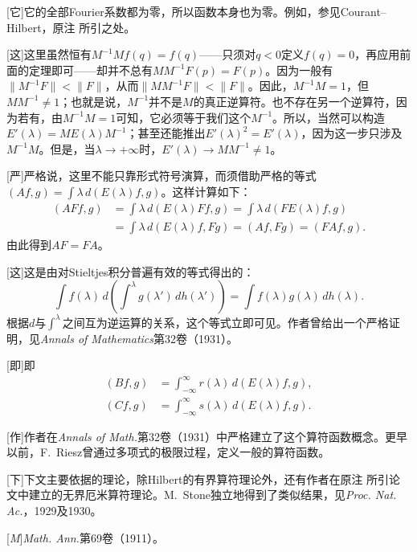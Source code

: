 \documentclass[fontsize=13pt,twoside,openany,headings=normal,parskip=false,bookmarkpackage=false,DIV=calc]{scrbook}
\begin{document}
[它]{它的全部Fourier系数都为零，所以函数本身也为零。例如，参见Courant–Hilbert，原注 \hyperlink{note-30}{} 所引之处。\hypertarget{origpage-246}{}\label{origpage-246}}

[这]{这里虽然恒有$M^{-1}Mf(q)=f(q)$——只须对$q<0$定义$f(q)=0$，再应用前面的定理即可——却并不总有$MM^{-1}F(p)=F(p)$。因为一般有$\lVert M^{-1}F\rVert<\lVert F\rVert$，从而$\lVert MM^{-1}F\rVert<\lVert F\rVert$。因此，$M^{-1}M=1$，但$MM^{-1}\ne1$；也就是说，$M^{-1}$并不是$M$的真正逆算符。也不存在另一个逆算符，因为若有，由$M^{-1}M=1$可知，它必须等于我们这个$M^{-1}$。所以，当然可以构造$E'(\lambda)=ME(\lambda)M^{-1}$；甚至还能推出$E'(\lambda)^2=E'(\lambda)$，因为这一步只涉及$M^{-1}M$。但是，当$\lambda\to+\infty$时，$E'(\lambda)\to MM^{-1}\ne1$。}

[严]{严格说，这里不能只靠形式符号演算，而须借助严格的等式$(Af,\allowbreak g)=\int\lambda\,d(E(\lambda)f,\allowbreak g)$。这样计算如下：
\begin{align*}
(AFf,g)&=\int\lambda\,d(E(\lambda)Ff,g)
=\int\lambda\,d(FE(\lambda)f,g)\\
&=\int\lambda\,d(E(\lambda)f,Fg)
=(Af,Fg)=(FAf,g).
\end{align*}
由此得到$AF=FA$。}

[这]{这是由对Stieltjes积分普遍有效的等式得出的：
\[
\int f(\lambda)\,d\left(\int^\lambda g(\lambda')\,dh(\lambda')\right)
=\int f(\lambda)g(\lambda)\,dh(\lambda).
\]
根据$d$与$\int^\lambda$之间互为逆运算的关系，这个等式立即可见。作者曾给出一个严格证明，见\emph{Annals of Mathematics}第32卷（1931）。}

[即]{即
\begin{align*}
(Bf,g)&=\int_{-\infty}^{\infty}r(\lambda)\,d(E(\lambda)f,g),\\
(Cf,g)&=\int_{-\infty}^{\infty}s(\lambda)\,d(E(\lambda)f,g).
\end{align*}}

[作]{作者在\emph{Annals of Math.}第32卷（1931）中严格建立了这个算符函数概念。更早以前，F.~Riesz曾通过多项式的极限过程，定义一般的算符函数。}

[下]{下文主要依据的理论，除Hilbert的有界算符理论外，还有作者在原注 \hyperlink{note-78}{} 所引论文中建立的无界厄米算符理论。M.~Stone独立地得到了类似结果，见\emph{Proc. Nat. Ac.}，1929及1930。}

[\emph{M}]{\emph{Math. Ann.}第69卷（1911）。}
\end{document}
